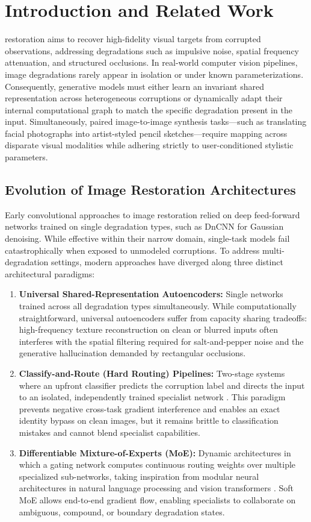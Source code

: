 \documentclass[conference]{IEEEtran}
\begin{document}
\section{Introduction and Related Work}
 restoration aims to recover high-fidelity visual targets from corrupted observations, addressing degradations such as impulsive noise, spatial frequency attenuation, and structured occlusions. In real-world computer vision pipelines, image degradations rarely appear in isolation or under known parameterizations. Consequently, generative models must either learn an invariant shared representation across heterogeneous corruptions or dynamically adapt their internal computational graph to match the specific degradation present in the input. Simultaneously, paired image-to-image synthesis tasks—such as translating facial photographs into artist-styled pencil sketches—require mapping across disparate visual modalities while adhering strictly to user-conditioned stylistic parameters.

\subsection{Evolution of Image Restoration Architectures}
Early convolutional approaches to image restoration relied on deep feed-forward networks trained on single degradation types, such as DnCNN \cite{zhang2017beyond} for Gaussian denoising. While effective within their narrow domain, single-task models fail catastrophically when exposed to unmodeled corruptions. To address multi-degradation settings, modern approaches have diverged along three distinct architectural paradigms:
\begin{enumerate}
    \item \textbf{Universal Shared-Representation Autoencoders:} Single networks trained across all degradation types simultaneously. While computationally straightforward, universal autoencoders suffer from capacity sharing tradeoffs: high-frequency texture reconstruction on clean or blurred inputs often interferes with the spatial filtering required for salt-and-pepper noise and the generative hallucination demanded by rectangular occlusions.
    \item \textbf{Classify-and-Route (Hard Routing) Pipelines:} Two-stage systems where an upfront classifier predicts the corruption label and directs the input to an isolated, independently trained specialist network \cite{yu2018crafting}. This paradigm prevents negative cross-task gradient interference and enables an exact identity bypass on clean images, but it remains brittle to classification mistakes and cannot blend specialist capabilities.
    \item \textbf{Differentiable Mixture-of-Experts (MoE):} Dynamic architectures in which a gating network computes continuous routing weights over multiple specialized sub-networks, taking inspiration from modular neural architectures in natural language processing and vision transformers \cite{shazeer2017outrageously, eigen2014learning}. Soft MoE allows end-to-end gradient flow, enabling specialists to collaborate on ambiguous, compound, or boundary degradation states.
\end{enumerate}
\end{document}
